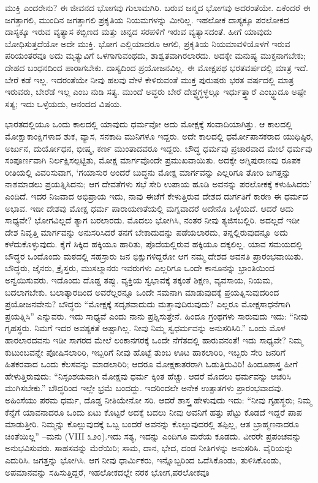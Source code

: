 ಮುಕ್ತಿ ಎಂದರೇನು? ಈ ಜೀವನದ ಭೋಗವು ಗುಲಾಮಗಿರಿ. ಬರುವ ಜನ್ಮದ ಭೋಗವು ಅದರಂತೆಯೇ. ಏಕೆಂದರೆ ಈ ಜಗತ್ತಾಗಲಿ, ಮುಂದಿನ ಜಗತ್ತಾಗಲಿ ಪ್ರಕೃತಿಯ ನಿಯಮಗಳನ್ನು ಮೀರಿಲ್ಲ. ಇಹಲೋಕ ದಾಸ್ಯಕ್ಕೂ ಪರಲೋಕದ ದಾಸ್ಯಕ್ಕೂ ಇರುವ ವ್ಯತ್ಯಾಸ ಕಬ್ಬಿಣದ ಮತ್ತು ಚಿನ್ನದ ಸರಪಳಿಗೆ ಇರುವ ವ್ಯತ್ಯಾಸದಂತೆ. ಹೀಗೆ ಯಾವುದು ಬೋಧಿಸುತ್ತದೆಯೋ ಅದೇ ಮುಕ್ತಿ. ಭೋಗ ಎಲ್ಲಿಯಾದರೂ ಆಗಲಿ, ಪ್ರಕೃತಿಯ ನಿಯಮಾ\break ವಳಿಯೊಳಗೆ ಇರುವ ಪರಿಯಂತರವೂ ಅದು ಮೃತ್ಯುವಿಗೆ ಒಳಗಾಗುವಂಥದು, ಶಾಶ್ವತ\break ವಾಗಿರಲಾರದು. ಅದಕ್ಕೇ ಮನುಷ್ಯ ಮುಕ್ತನಾಗಬೇಕು; ದೇಹದ ಬಂಧನದಿಂದ ಪಾರಾಗಬೇಕು. ದಾಸ್ಯದಿಂದ ಪ್ರಯೋಜನವಿಲ್ಲ. ಈ ಮೋಕ್ಷಪಥ ಭರತವರ್ಷದಲ್ಲಿ ಮಾತ್ರ ಇದೆ. ಬೇರೆ ಕಡೆ ಇಲ್ಲ. ಇದರಂತೆಯೇ ನೀವು ಹಲವು ವೇಳೆ ಕೇಳಿರುವಂತೆ ಮುಕ್ತ ಪುರುಷರು ಭರತ ವರ್ಷದಲ್ಲಿ ಮಾತ್ರ ಇರುವರು, ಬೇರೆಡೆ ಇಲ್ಲ ಎಂಬ ನುಡಿ ಸತ್ಯ. ಮುಂದೆ ಅವ್ಧರು ಬೇರೆ ದೇಶ್ಧ್ಧಗ್ಧಳ್ಧಲ್ಲೂ ಇರ್ಧುತ್ತ್ಧಾರೆ ಎಂಬ್ಧ್ಧುದೂ ಅಷ್ಟೇ ಸತ್ಯ; ಇದು ಒಳ್ಳೆಯದು, ಆನಂದದ ವಿಷಯ.

ಭಾರತದಲ್ಲಿಯೂ ಒಂದು ಕಾಲದಲ್ಲಿ ಯಾವುದು ಧರ್ಮವೋ ಅದು ಮೋಕ್ಷಕ್ಕೆ ಸಂವಾದಿಯಾಗಿತ್ತು. ಆ ಕಾಲದಲ್ಲಿ ಮೋಕ್ಷಾಕಾಂಕ್ಷಿಗಳಾದ ಶುಕ, ವ್ಯಾಸ, ಸನಕಾದಿ ಮುನಿಗಳೂ ಇದ್ದರು. ಅದೇ ಕಾಲದಲ್ಲಿ ಧರ್ಮೋಪಾಸಕರಾದ ಯುಧಿಷ್ಠಿರ, ಅರ್ಜುನ, ದುರ್ಯೋಧನ, ಭೀಷ್ಮ, ಕರ್ಣ ಮುಂತಾದವರೂ ಇದ್ದರು. ಬೌದ್ಧ ಧರ್ಮವು ಪ್ರಚಾರವಾದ ಮೇಲೆ ಧರ್ಮವು ಸಂಪೂರ್ಣವಾಗಿ ನಿರ್ಲಕ್ಷಿಸಲ್ಪಟ್ಟಿತು, ಮೋಕ್ಷ ಮಾರ್ಗವೊಂದೇ ಪ್ರಮುಖ\break ವಾಯಿತು. ಅದಕ್ಕೇ ಅಗ್ನಿಪುರಾಣವು ರೂಪಕ ರೀತಿಯಲ್ಲಿ ವಿವರಿಸುವಾಗ, ‘ಗಯಾಸುರ ಅಂದರೆ ಬುದ್ಧನು ಮೋಕ್ಷ ಮಾರ್ಗವನ್ನು ಎಲ್ಲರಿಗೂ ತೋರಿ ಜಗತ್ತನ್ನು ನಾಶಮಾಡಲು ಪ್ರಯತ್ನಿಸಿದನು; ಆಗ ದೇವತೆಗಳು ಸಭೆ ಸೇರಿ ಉಪಾಯ ಹೂಡಿ ಅವನನ್ನು ಪರಲೋಕಕ್ಕೆ ಕಳುಹಿಸಿದರು’ ಎಂದಿದೆ. ಇದರ ನಿಜವಾದ ಅಭಿಪ್ರಾಯ ಇದು, ನಾವು ಈಚೆಗೆ ಕೇಳುತ್ತಿರುವ ದೇಶದ ದುರ್ಗತಿಗೆ ಕಾರಣ ಈ ಧರ್ಮದ ಅಭಾವ. ಇಡೀ ದೇಶವು ಮೋಕ್ಷ ಧರ್ಮ ಪಾರಾಯಣತೆಯಲ್ಲಿ ಮಗ್ನವಾದರೆ ಅದೇನೊ ಒಳ್ಳೆಯದೆ. ಆದರೆ ಅದು ಸಾಧ್ಯವೇ? ಭೋಗವಿಲ್ಲದೆ ತ್ಯಾಗ ಬರಲಾರದು. ಮೊದಲು ಭೋಗಿಸಿ, ನಂತರ ನೀವು ತ್ಯಜಿಸಬಲ್ಲಿರಿ. ಅದಲ್ಲದೆ ಇಡೀ ದೇಶ ನಿವೃತ್ತಿ ಮಾರ್ಗವನ್ನು ಅನುಸರಿಸಿದರೆ ತನಗೆ ಬೇಕಾದುದನ್ನು ಪಡೆಯಲಾರದು, ತನ್ನಲ್ಲಿರುವುದನ್ನೂ ಅದು ಕಳೆದುಕೊಳ್ಳುವುದು. ಕೈಗೆ ಸಿಕ್ಕಿದ ಹಕ್ಕಿಯೂ ಹಾರಿತು, ಪೊದೆಯಲ್ಲಿರುವ ಹಕ್ಕಿಯೂ ದಕ್ಕಲಿಲ್ಲ. ಯಾವ ಸಮಯದಲ್ಲಿ ಬೌದ್ಧರ ಒಂದೊಂದು ಮಠದಲ್ಲಿ ಸಹಸ್ರಾರು ಜನ ಭಿಕ್ಷುಗಳಿದ್ದರೋ ಆಗ ನಮ್ಮ ದೇಶದ ಅವನತಿ ಪ್ರಾರಂಭವಾಯಿತು. ಬೌದ್ಧರು, ಜೈನರು, ಕ್ರೈಸ್ತರು, ಮುಸಲ್ಮಾನರು ಇವರುಗಳು ಎಲ್ಲರಿಗೂ ಒಂದೇ ಕಾನೂನನ್ನು ಭ್ರಾಂತಿಯಿಂದ ಅನ್ವಯಿಸುವರು. ಇದೊಂದು ದೊಡ್ಡ ತಪ್ಪು. ವ್ಯಕ್ತಿಯ ಸ್ವಭಾವಕ್ಕೆ ತಕ್ಕಂತೆ ಶಿಕ್ಷಣ, ವ್ಯವಸಾಯ, ನಿಯಮ, ಬದಲಾಗಬೇಕು. ಬಲಾತ್ಕಾರದಿಂದ ಅವರೆಲ್ಲರನ್ನೂ ಒಂದೇ ಸಮನಾಗಿ ಮಾಡುವುದಕ್ಕೆ ಪ್ರಯತ್ನಿಸುವುದರಿಂದ ಪ್ರಯೋಜನವೇನು? ಬೌದ್ಧರು “ಮೋಕ್ಷಕ್ಕೆ ಸದೃಶವಾದುದು ಮತ್ತಾವುದಿರುವುದು? ಎಲ್ಲರೂ ಮೋಕ್ಷ\break ಸಾಧನೆಗಾಗಿ ಪ್ರಯತ್ನಿಸಿ” ಎನ್ನುವರು. ಇದು ಸಾಧ್ಯವೆ ಎಂದು ನಾನು ಪ್ರಶ್ನಿಸುತ್ತೇನೆ. ಹಿಂದೂ ಗ್ರಂಥಗಳು ಸಾರುವುದು ಇದು: “ನೀವು ಗೃಹಸ್ಥರು. ನಿಮಗೆ ಇದರ ಅವಶ್ಯಕತೆ ಅಷ್ಟಾಗಿಲ್ಲ. ನೀವು ನಿಮ್ಮ ಸ್ವಧರ್ಮವನ್ನು ಅನುಸರಿಸಿರಿ.” ಒಂದು ಮೊಳ ಹಾರಲಾರದವನು ಇಡೀ ಸಾಗರದ ಮೇಲೆ ಲಂಕಾನಗರಕ್ಕೆ ಒಂದೇ ನೆಗೆತದಲ್ಲಿ ಹಾರುವನಂತೆ! ಇದು ಸಾಧ್ಯವೇ? ನಿಮ್ಮ ಕುಟುಂಬವನ್ನೇ ಪೋಷಿಸಲಾರಿರಿ, ಇಬ್ಬರಿಗೆ ನೀವು ಹೊಟ್ಟೆ ತುಂಬ ಊಟ ಹಾಕಲಾರಿರಿ, ಇಬ್ಬರು ಸೇರಿ ಜನರಿಗೆ ಹಿತಕರವಾದ ಒಂದು ಕೆಲಸವನ್ನು ಮಾಡಲಾರಿರಿ; ಆದರೂ ಮೋಕ್ಷಕಾತರರಾಗಿ ಓಡುತ್ತಿರುವಿರಿ! ಹಿಂದೂಶಾಸ್ತ್ರ ಹೀಗೆ ಹೇಳುತ್ತಿರುವುದು: “ನಿಸ್ಸಂಶಯವಾಗಿ ಮೋಕ್ಷವು ಧರ್ಮ ಕ್ಕಿಂತ ಹೆಚ್ಚು. ಆದರೆ ಮೊದಲು ಧರ್ಮವನ್ನು ಆಚರಿಸಿ ಮುಗಿಸಬೇಕು.” ಬೌದ್ಧರಿಂದ ಇಲ್ಲೇ ಭ್ರಮೆ ಬಂದದ್ದು. ಇದರಿಂದಲೇ ಅನೇಕ ಉತ್ಪಾತಗಳು ಪ್ರಾರಂಭವಾದವು. ಅಹಿಂಸೆಯು ಪರಮ ಧರ್ಮ, ದೊಡ್ಡ ನೀತಿಯೇನೋ ಸರಿ. ಆದರೆ ಶಾಸ್ತ್ರ ಹೇಳುವುದು ಇದು: “ನೀವು ಗೃಹಸ್ಥರು; ನಿಮ್ಮ ಕೆನ್ನೆಗೆ ಯಾವನಾದರೂ ಒಂದು ಏಟು ಕೊಟ್ಟರೆ ಅದಕ್ಕೆ ಬದಲು ನೀವು ಅವನಿಗೆ ಹತ್ತು ಪೆಟ್ಟು ಕೊಡದೆ ಇದ್ದರೆ ಪಾಪ ಮಾಡುತ್ತೀರಿ. ನಿಮ್ಮನ್ನು ಕೊಲ್ಲುವುದಕ್ಕೆ ಒಬ್ಬ ಬಂದರೆ ಅವನನ್ನು ಕೊಲ್ಲುವುದರಲ್ಲಿ ತಪ್ಪಿಲ್ಲ, ಆತ ಬ್ರಾಹ್ಮಣನಾದರೂ ಚಿಂತೆಯಿಲ್ಲ” –ಮನು (VIII ೩೨೦).ಇದು ಸತ್ಯ, ಇದನ್ನು ಎಂದಿಗೂ ಮರೆಯ ಕೂಡದು. ವೀರರೇ ಪ್ರಪಂಚವನ್ನು ಅನುಭವಿಸುವರು. ಸಾಹಸವನ್ನು ಮೆರೆಯಿರಿ; ಸಾಮ, ದಾನ, ಭೇದ, ದಂಡ ನೀತಿಗಳನ್ನು ಅನುಸರಿಸಿ. ವೈರಿಯನ್ನು ಎದುರಿಸಿ. ಜಗತ್ತನ್ನು ಭೋಗಿಸಿ. ಆಗ ನೀವು ಧಾರ್ಮಿಕರು, ಇನ್ನೊಬ್ಬರಿಂದ ಒದೆಸಿಕೊಂಡು, ತುಳಿಸಿಕೊಂಡು, ಅಪಮಾನವನ್ನು ಸಹಿಸುತ್ತಿದ್ದರೆ, ಇಹಲೋಕದಲ್ಲೇ ನರಕ ಭೋಗ,\break ಪರಲೋಕವೂ 
